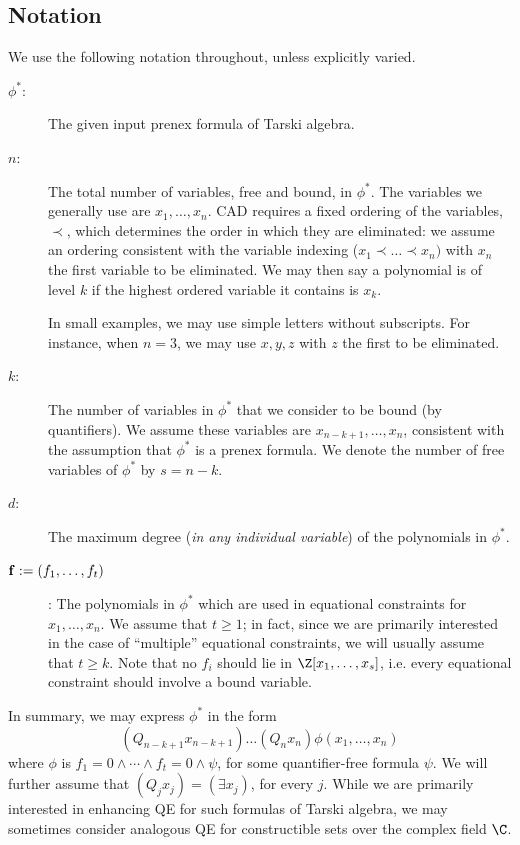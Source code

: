 \documentclass{article}
\begin{document}
\subsection{Notation}

We use the following notation throughout, unless explicitly varied.
\begin{description}

\item[$\phi^*$:] The given input prenex formula of Tarski algebra.

\item[$n$:] The total number of variables, free and bound, in $\phi^*$. The
variables we generally use are $x_1,\ldots,x_n$.  CAD requires a fixed ordering of the variables, $\prec$, which determines the order in which they are eliminated:  we assume an ordering consistent with the variable indexing ($x_1 \prec \dots \prec x_n)$ with $x_n$ the first variable to be eliminated. We may then say a polynomial is of level $k$ if the highest ordered variable it contains is $x_k$.

In small examples, we may use simple letters without subscripts.
For instance, when $n=3$, we may use $x,y,z$ with $z$ the first to be eliminated.

\item[$k$:] The number of variables in $\phi^*$
that we consider to be bound (by quantifiers).
We assume these variables are $x_{n-k+1},\ldots,x_n$, consistent with the assumption that $\phi^*$ is a prenex formula. 
We denote the number of free variables of $\phi^*$ by $s = n-k$.

\item[$d$:] The maximum degree (\emph{in any individual variable}) of the polynomials in $\phi^*$.

\item[${\bf f}:=(f_1,\ldots,f_{t})$]: The polynomials in $\phi^*$ which are used in equational constraints for $x_{1},\allowbreak\ldots,x_n$.  We assume that $t \ge 1$; in fact, since we are primarily interested in the case of ``multiple'' equational constraints, we will usually assume that $t \ge k$. Note that no $f_i$ should lie in $\Z[x_1, \ldots,x_s]$, i.e. every equational constraint should involve a bound variable.

\end{description}
In summary, we may express $\phi^*$ in the form
\[ 
(Q_{n-k+1} x_{n-k+1}) \dots (Q_n x_n) \phi(x_1, \ldots, x_n)
\]
where $\phi$ is $f_1 = 0 \wedge \cdots \wedge f_{t} = 0 \wedge \psi$, for some quantifier-free formula $\psi$. We will further assume that $(Q_j x_j) = (\exists x_j)$, for every $j$. While we are primarily interested in enhancing QE for such formulas of Tarski algebra, we may sometimes consider analogous QE for constructible sets over the complex field $\C$.
 
\end{document}
